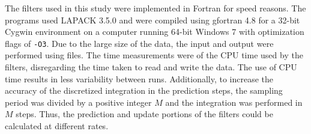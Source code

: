 \documentclass[../zhang_thesis.tex]{subfiles}
\begin{document}
The filters used in this study were implemented in Fortran for speed reasons. The programs used LAPACK 3.5.0 and were compiled using gfortran 4.8 for a 32-bit Cygwin environment on a computer running 64-bit Windows 7 with optimization flags of \texttt{-O3}. Due to the large size of the data, the input and output were performed using files. The time measurements were of the CPU time used by the filters, disregarding the time taken to read and write the data. The use of CPU time results in less
variability between runs. Additionally, to increase the accuracy of the discretized integration in the prediction steps, the sampling period was divided by a positive integer $M$ and the integration was performed in $M$ steps. Thus, the prediction and update portions of the filters could be calculated at different rates.
\end{document}

